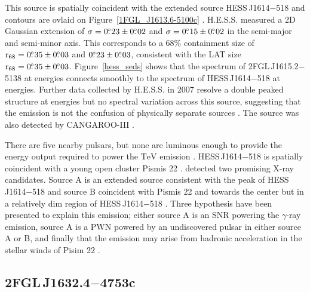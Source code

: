 \documentclass[12pt,preprint]{aastex}
\newcommand{\gev}{\text{GeV}\xspace}
\newcommand{\tev}{\text{TeV}\xspace}
\newcommand{\suzaku}{\text{{\em Suzaku}}\xspace}
\newcommand{\rsixeight}{{\ensuremath{\text{r}_{68}}}\xspace}
\begin{document}
This source is spatially coincident with the extended
\tev source HESS\,J1614$-$518 and \tev contours
are ovlaid on
Figure~\ref{1FGL_J1613.6-5100c}
\citep{hess_plane_survey}. 
H.E.S.S. measured a 2D Gaussian
extension of $\sigma=0\mbox{$.\!\!^\circ$}23\pm0\mbox{$.\!\!^\circ$}02$ and $\sigma=0\mbox{$.\!\!^\circ$}15\pm0\mbox{$.\!\!^\circ$}02$
in the semi-major and semi-minor axis. This corresponds
to a 68\% containment size of $\rsixeight=0\fdg35\pm0\fdg03$
and $0\mbox{$.\!\!^\circ$}23\pm0\mbox{$.\!\!^\circ$}03$,  consistent with the LAT size
$\rsixeight=0\fdg35\pm0\fdg03$.  Figure~\ref{hess_seds} shows
that the spectrum of 2FGL\,J1615.2$-$5138 at \gev energies
connects smoothly to
the spectrum of HESS\,J1614$-$518 at \tev energies.  Further data collected by
H.E.S.S. in 2007 resolve a double peaked structure at \tev
energies
but no spectral variation across this source, suggesting
that the emission is not the confusion of physically separate sources
\citep{closer_look_hess_j1614-518}.  The source was also detected by
CANGAROO-III \citep{cangaroo_j1614-518}.

There are five nearby pulsars, but none are luminous enough to
provide the energy output required to power the $\tev$ 
emission \citep{closer_look_hess_j1614-518}.  HESS\,J1614$-$518
is spatially coincident with a young open cluster Pismis 22
\citep{hess_1614_landi_atel,closer_look_hess_j1614-518}.
\suzaku detected two
promising X-ray candidates. Source A is an extended source consistent
with the peak of HESS\,J1614$-$518 and source B coincident with Pismis 22
and towards the center but in a relatively dim region of HESS\,J1614$-$518
\citep{suazku_hess_j1614_518}.  Three hypothesis have been presented to
explain this emission; either source A is an SNR powering the $\gamma$-ray
emission, source A is a PWN powered by an undiscovered pulsar in either
source A or B, and finally that the emission may arise from hadronic 
acceleration in the stellar winds of Pisim 22 \citep{cangaroo_j1614-518}.

\subsection{2FGL\,J1632.4$-$4753c}
\label{section_2FGL_J1632.4-4753c}


\end{document}
